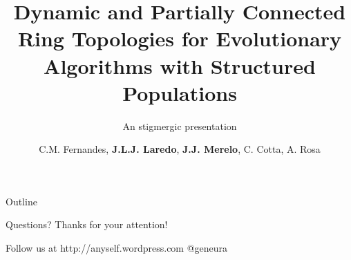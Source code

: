 \documentclass{beamer}[10]
\title{Dynamic and Partially Connected Ring Topologies for Evolutionary Algorithms with Structured Populations}
\subtitle{An stigmergic presentation}
\author{C.M. Fernandes, \textbf{J.L.J. Laredo}, \textbf{J.J. Merelo}, C. Cotta, A. Rosa}
\date{}
\begin{document}
\begin{frame}
  \titlepage
\end{frame}


\begin{frame}{Outline}
  \tableofcontents
\end{frame}






\begin{frame}{Questions?}
Thanks for your attention! 

Follow us at http://anyself.wordpress.com @geneura
\end{frame}
\end{document}
